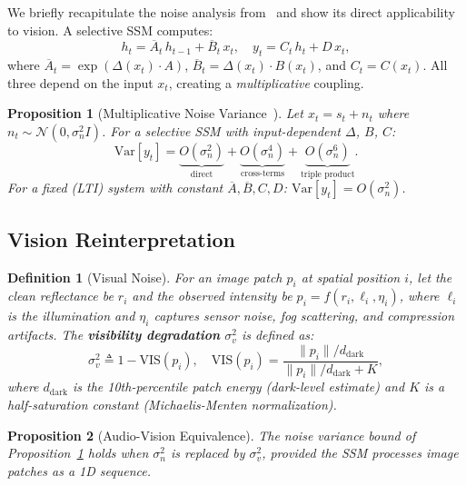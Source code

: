 \documentclass[10pt,twocolumn,letterpaper]{article}
\newtheorem{proposition}{Proposition}
\newtheorem{definition}{Definition}
\begin{document}
We briefly recapitulate the noise analysis from~\cite{choi2026ncssm} and show its direct applicability to vision.
A selective SSM computes:
\begin{equation}
h_t = \overline{A}_t \, h_{t-1} + \overline{B}_t \, x_t, \quad
y_t = C_t \, h_t + D \, x_t,
\label{eq:ssm}
\end{equation}
where $\overline{A}_t = \exp(\Delta(x_t) \cdot A)$, $\overline{B}_t = \Delta(x_t) \cdot B(x_t)$, and $C_t = C(x_t)$.
All three depend on the input $x_t$, creating a \emph{multiplicative} coupling.

\begin{proposition}[Multiplicative Noise Variance~\cite{choi2026ncssm}]
\label{prop:noise}
Let $x_t = s_t + n_t$ where $n_t \sim \mathcal{N}(0, \sigma_n^2 I)$.
For a selective SSM with input-dependent $\Delta$, $B$, $C$:
\begin{equation}
\text{Var}[y_t] = \underbrace{O(\sigma_n^2)}_{\text{direct}} + \underbrace{O(\sigma_n^4)}_{\text{cross-terms}} + \underbrace{O(\sigma_n^6)}_{\text{triple product}}.
\end{equation}
For a fixed (LTI) system with constant $\overline{A}, \overline{B}, C, D$:
$\text{Var}[y_t] = O(\sigma_n^2)$.
\end{proposition}

\subsection{Vision Reinterpretation}

\begin{definition}[Visual Noise]
For an image patch $p_i$ at spatial position $i$, let the clean reflectance be $r_i$ and the observed intensity be $p_i = f(r_i, \ell_i, \eta_i)$, where $\ell_i$ is the illumination and $\eta_i$ captures sensor noise, fog scattering, and compression artifacts.
The \textbf{visibility degradation} $\sigma_v^2$ is defined as:
\begin{equation}
\sigma_v^2 \triangleq 1 - \text{VIS}(p_i), \quad
\text{VIS}(p_i) = \frac{\|p_i\| / d_{\text{dark}}}{\|p_i\| / d_{\text{dark}} + K},
\label{eq:visibility}
\end{equation}
where $d_{\text{dark}}$ is the 10th-percentile patch energy (dark-level estimate) and $K$ is a half-saturation constant (Michaelis-Menten normalization).
\end{definition}

\begin{proposition}[Audio-Vision Equivalence]
\label{prop:equiv}
The noise variance bound of Proposition~\ref{prop:noise} holds when $\sigma_n^2$ is replaced by $\sigma_v^2$, provided the SSM processes image patches as a 1D sequence.
\end{proposition}
\end{document}
